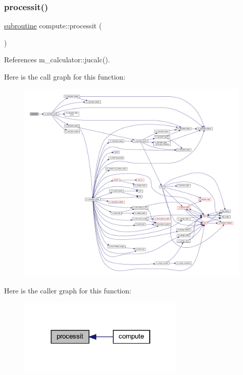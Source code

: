 \subsubsection{\texorpdfstring{processit()}{processit()}}
{\footnotesize\ttfamily \hyperlink{M__stopwatch_83_8txt_acfbcff50169d691ff02d4a123ed70482}{subroutine} compute\+::processit (\begin{DoxyParamCaption}{ }\end{DoxyParamCaption})}



References m\+\_\+calculator\+::jucalc().

Here is the call graph for this function\+:
\nopagebreak
\begin{figure}[H]
\begin{center}
\leavevmode
\includegraphics[width=350pt]{compute_8f90_a6b077f312d27a28f21803c6d624132b7_cgraph}
\end{center}
\end{figure}
Here is the caller graph for this function\+:
\nopagebreak
\begin{figure}[H]
\begin{center}
\leavevmode
\includegraphics[width=226pt]{compute_8f90_a6b077f312d27a28f21803c6d624132b7_icgraph}
\end{center}
\end{figure}
